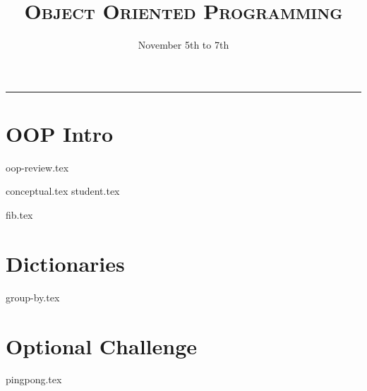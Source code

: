 \documentclass{exam}
\title{\textsc{Object Oriented Programming}}
\date{November 5th to 7th}
\begin{document}
\maketitle
\rule{\textwidth}{0.15em}
\fontsize{12}{15}\selectfont


\begin{questions}
\section{OOP Intro}
{oop-review.tex}


{conceptual.tex}
\newpage
{student.tex}

\newpage

{fib.tex}
\newpage
\section{Dictionaries}
{group-by.tex}

\newpage
\section{Optional Challenge}
{pingpong.tex}


\end{questions}
\end{document}
